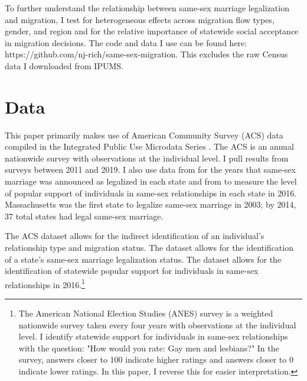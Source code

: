 \documentclass[12pt,letterpaper]{article}
\begin{document}
To further understand the relationship between same-sex marriage legalization and migration, I test for heterogeneous effects across migration flow types, gender, and region and for the relative importance of statewide social acceptance in migration decisions. The code and data I use can be found here: https://github.com/nj-rich/same-sex-migration. This excludes the raw Census data I downloaded from IPUMS.

\section{Data}

This paper primarily makes use of American Community Survey (ACS) data compiled in the Integrated Public Use Microdata Series \citep{28}. The ACS is an annual nationwide survey with observations at the individual level. I pull results from surveys between 2011 and 2019. I also use data from \citet{27} for the years that same-sex marriage was announced as legalized in each state and from \citet{29} to measure the level of popular support of individuals in same-sex relationships in each state in 2016. Massachusetts was the first state to legalize same-sex marriage in 2003; by 2014, 37 total states had legal same-sex marriage.



The ACS dataset allows for the indirect identification of an individual’s relationship type and migration status. The \citet{27} dataset allows for the identification of a state’s same-sex marriage legalization status. The \citet{29} dataset allows for the identification of statewide popular support for individuals in same-sex relationships in 2016.\footnote{The American National Election Studies (ANES) survey is a weighted nationwide survey taken every four years with observations at the individual level. I identify statewide support for individuals in same-sex relationships with the question: "How would you rate: Gay men and lesbians?" In the survey, answers closer to 100 indicate higher ratings and answers closer to 0 indicate lower ratings. In this paper, I reverse this for easier interpretation.}
\end{document}
